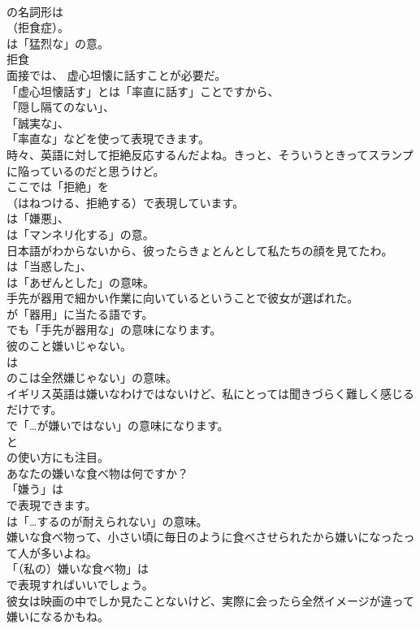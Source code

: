 \documentclass[8pt]{extreport}
\begin{document}
\begin{CJK}{UTF8}{min}
\\	の名詞形は
\\	（拒食症）。
\\	は「猛烈な」の意。	
\\	拒食
\\	面接では、 虚心坦懐に話すことが必要だ。 
\\	「虚心坦懐話す」とは「率直に話す」ことですから、
\\	「隠し隔てのない」、
\\	「誠実な」、
\\	「率直な」などを使って表現できます。	
\\	時々、英語に対して拒絶反応するんだよね。きっと、そういうときってスランプに陥っているのだと思うけど。 
\\	ここでは「拒絶」を 
\\	（はねつける、拒絶する）で表現しています。
\\	は「嫌悪」、
\\	は「マンネリ化する」の意。	
\\	日本語がわからないから、彼ったらきょとんとして私たちの顔を見てたわ。 
\\	は「当惑した」、
\\	は「あぜんとした」の意味。	
\\	手先が器用で細かい作業に向いているということで彼女が選ばれた。 
\\	が「器用」に当たる語です。
\\	でも「手先が器用な」の意味になります。	
\\	彼のこと嫌いじゃない。 
\\	は
\\	のこは全然嫌じゃない」の意味。	
\\	イギリス英語は嫌いなわけではないけど、私にとっては聞きづらく難しく感じるだけです。 
\\	で「…が嫌いではない」の意味になります。
\\	と
\\	の使い方にも注目。	
\\	あなたの嫌いな食べ物は何ですか？ 
\\	「嫌う」は
\\	で表現できます。
\\	は「…するのが耐えられない」の意味。	
\\	嫌いな食べ物って、小さい頃に毎日のように食べさせられたから嫌いになったって人が多いよね。 
\\	「（私の）嫌いな食べ物」は
\\	で表現すればいいでしょう。	
\\	彼女は映画の中でしか見たことないけど、実際に会ったら全然イメージが違って嫌いになるかもね。 

\end{CJK}
\end{document}

